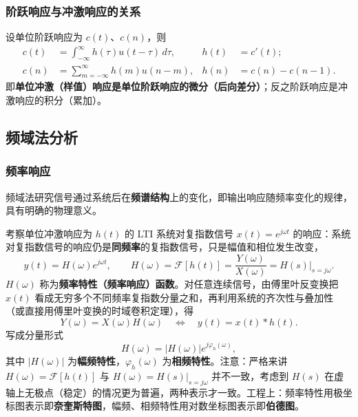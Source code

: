 \subsubsection{阶跃响应与冲激响应的关系}
设单位阶跃响应为 $c(t)$、$c(n)$，则
\begin{align}
c(t)&=\int_{-\infty}^{\infty}h(\tau)u(t-\tau)\,d\tau, & h(t)&=c'(t);\\
c(n)&=\sum_{m=-\infty}^{\infty}h(m)u(n-m), & h(n)&=c(n)-c(n-1).
\end{align}
即\textbf{单位冲激（样值）响应是单位阶跃响应的微分（后向差分）}；反之阶跃响应是冲激响应的积分（累加）。

\subsection{频域法分析}

\subsubsection{频率响应}
频域法研究信号通过系统后在\textbf{频谱结构}上的变化，即输出响应随频率变化的规律，具有明确的物理意义。

考察单位冲激响应为 $h(t)$ 的 LTI 系统对复指数信号 $x(t)=e^{j\omega t}$ 的响应：系统对复指数信号的响应仍是\textbf{同频率}的复指数信号，只是幅值和相位发生改变，
\begin{equation}
y(t)=H(\omega)e^{j\omega t},\qquad H(\omega)=\mathcal{F}[h(t)]=\frac{Y(\omega)}{X(\omega)}=H(s)\Big|_{s=j\omega}.
\end{equation}
$H(\omega)$ 称为\textbf{频率特性（频率响应）函数}。对任意连续信号，由傅里叶反变换把 $x(t)$ 看成无穷多个不同频率复指数分量之和，再利用系统的齐次性与叠加性（或直接用傅里叶变换的时域卷积定理），得
\begin{equation}
Y(\omega)=X(\omega)H(\omega)\quad\Longleftrightarrow\quad y(t)=x(t)*h(t).
\end{equation}
写成分量形式
\begin{equation}
H(\omega)=\big|H(\omega)\big|e^{j\varphi_h(\omega)},
\end{equation}
其中 $|H(\omega)|$ 为\textbf{幅频特性}，$\varphi_h(\omega)$ 为\textbf{相频特性}。注意：严格来讲 $H(\omega)=\mathcal{F}[h(t)]$ 与 $H(\omega)=H(s)|_{s=j\omega}$ 并不一致，考虑到 $H(s)$ 在虚轴上无极点（稳定）的情况更为普遍，两种表示才一致。工程上：频率特性用极坐标图表示即\textbf{奈奎斯特图}，幅频、相频特性用对数坐标图表示即\textbf{伯德图}。

